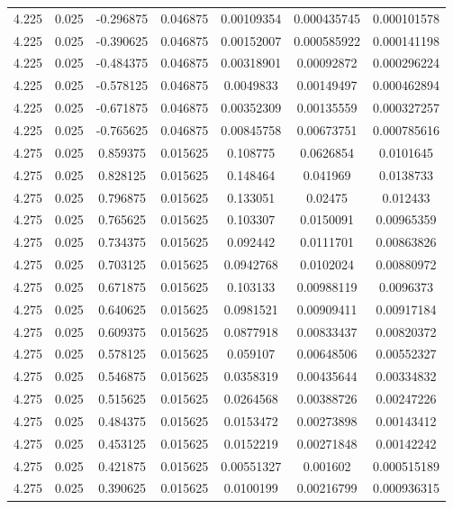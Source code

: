 \begin{flushleft}
\begin{longtable}{ccccccc}
4.225 & 0.025 & -0.296875 & 0.046875 & 0.00109354 & 0.000435745 & 0.000101578  \\ 
4.225 & 0.025 & -0.390625 & 0.046875 & 0.00152007 & 0.000585922 & 0.000141198  \\ 
4.225 & 0.025 & -0.484375 & 0.046875 & 0.00318901 & 0.00092872 & 0.000296224  \\ 
4.225 & 0.025 & -0.578125 & 0.046875 & 0.0049833 & 0.00149497 & 0.000462894  \\ 
4.225 & 0.025 & -0.671875 & 0.046875 & 0.00352309 & 0.00135559 & 0.000327257  \\ 
4.225 & 0.025 & -0.765625 & 0.046875 & 0.00845758 & 0.00673751 & 0.000785616  \\ 
4.275 & 0.025 & 0.859375 & 0.015625 & 0.108775 & 0.0626854 & 0.0101645  \\ 
4.275 & 0.025 & 0.828125 & 0.015625 & 0.148464 & 0.041969 & 0.0138733  \\ 
4.275 & 0.025 & 0.796875 & 0.015625 & 0.133051 & 0.02475 & 0.012433  \\ 
4.275 & 0.025 & 0.765625 & 0.015625 & 0.103307 & 0.0150091 & 0.00965359  \\ 
4.275 & 0.025 & 0.734375 & 0.015625 & 0.092442 & 0.0111701 & 0.00863826  \\ 
4.275 & 0.025 & 0.703125 & 0.015625 & 0.0942768 & 0.0102024 & 0.00880972  \\ 
4.275 & 0.025 & 0.671875 & 0.015625 & 0.103133 & 0.00988119 & 0.0096373  \\ 
4.275 & 0.025 & 0.640625 & 0.015625 & 0.0981521 & 0.00909411 & 0.00917184  \\ 
4.275 & 0.025 & 0.609375 & 0.015625 & 0.0877918 & 0.00833437 & 0.00820372  \\ 
4.275 & 0.025 & 0.578125 & 0.015625 & 0.059107 & 0.00648506 & 0.00552327  \\ 
4.275 & 0.025 & 0.546875 & 0.015625 & 0.0358319 & 0.00435644 & 0.00334832  \\ 
4.275 & 0.025 & 0.515625 & 0.015625 & 0.0264568 & 0.00388726 & 0.00247226  \\ 
4.275 & 0.025 & 0.484375 & 0.015625 & 0.0153472 & 0.00273898 & 0.00143412  \\ 
4.275 & 0.025 & 0.453125 & 0.015625 & 0.0152219 & 0.00271848 & 0.00142242  \\ 
4.275 & 0.025 & 0.421875 & 0.015625 & 0.00551327 & 0.001602 & 0.000515189  \\ 
4.275 & 0.025 & 0.390625 & 0.015625 & 0.0100199 & 0.00216799 & 0.000936315  \\ 

\end{longtable}
\end{flushleft}
